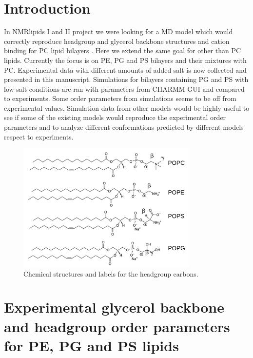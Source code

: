\documentclass[aps,prl,superscriptaddress,twocolumn]{revtex4}
\begin{document}
\section{Introduction}

In NMRlipids I and II project we were looking for a MD model
which would correctly reproduce headgroup and glycerol
backbone structures and cation binding for PC lipid bilayers \cite{botan15,catte16}.
Here we extend the same goal for other than PC lipids.
Currently the focus is on PE, PG and PS bilayers and their
mixtures with PC. Experimental data with different amounts of 
added salt is now collected and presented in this manuscript.
Simulations for bilayers containing PG and PS with low salt conditions
are ran with parameters from CHARMM GUI
and compared to experiments. Some order parameters from
simulations seems to be off from experimental values.
Simulation data from other models would be highly useful 
to see if some of the existing models would reproduce the 
experimental order parameters and to analyze different 
conformations predicted by different models respect to 
experiments.


\begin{figure}[]
  \centering
  \includegraphics[width=9.0cm]{../Figs/lipids.pdf}
  \caption{\label{lipids}
    Chemical structures and labels for the headgroup carbons.
  }
\end{figure}

\section{Experimental glycerol backbone and headgroup order parameters for PE, PG and PS lipids}
\end{document}
